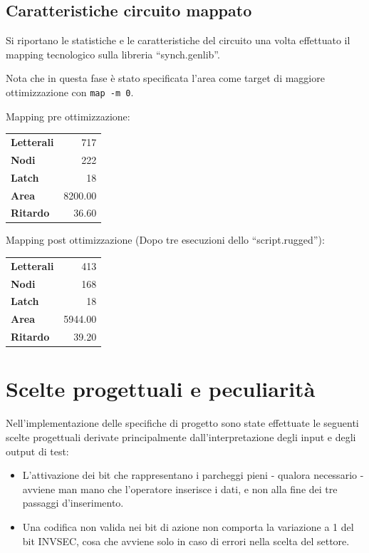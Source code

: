 \documentclass[
  12pt,
  a4paper,
  headings=optiontoheadandtoc
]{scrreprt}
\begin{document}
\section[nonumber=true]{Caratteristiche circuito mappato}

Si riportano le statistiche e le caratteristiche del circuito una volta effettuato il mapping tecnologico sulla libreria ``synch.genlib''.

Nota che in questa fase è stato specificata l'area come target di maggiore ottimizzazione con \verb|map -m 0|.

Mapping pre ottimizzazione:

\begin{tabularx}{150pt}{X|r}
\textbf{Letterali} & 717 \\
\textbf{Nodi} & 222 \\
\textbf{Latch} & 18 \\
\textbf{Area} & 8200.00 \\
\textbf{Ritardo} & 36.60
\end{tabularx}

Mapping post ottimizzazione (Dopo tre esecuzioni dello ``script.rugged''):

\begin{tabularx}{150pt}{X|r}
\textbf{Letterali} & 413 \\
\textbf{Nodi} & 168 \\
\textbf{Latch} & 18 \\
\textbf{Area} & 5944.00 \\
\textbf{Ritardo} & 39.20
\end{tabularx}


\chapter[nonumber=true]{Scelte progettuali e peculiarità}

Nell'implementazione delle specifiche di progetto sono state effettuate le seguenti scelte progettuali derivate principalmente dall'interpretazione degli input e degli output di test:

\begin{itemize}
  \item L'attivazione dei bit che rappresentano i parcheggi pieni - qualora necessario - avviene man mano che l'operatore inserisce i dati, e non alla fine dei tre passaggi d'inserimento.
  \item Una codifica non valida nei bit di azione non comporta la variazione a 1 del bit INVSEC, cosa che avviene solo in caso di errori nella scelta del settore.
\end{itemize}
\end{document}
